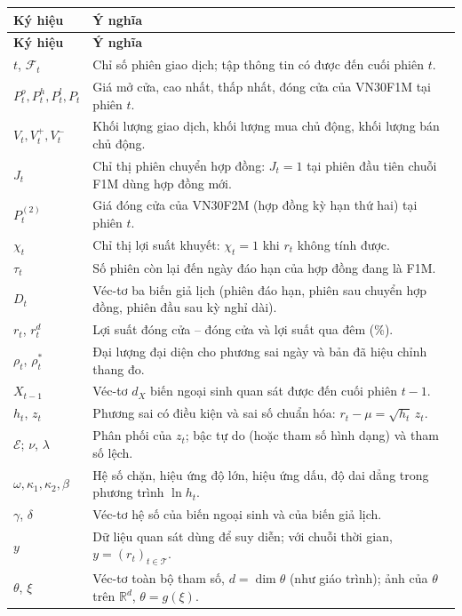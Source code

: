 \documentclass[12pt,a4paper]{article}
\theoremstyle{definition}
\theoremstyle{remark}
\newcommand{\Fcal}{\mathcal{F}}
\newcommand{\Ecal}{\mathcal{E}}
\begin{document}
\begin{longtable}{@{}p{3.4cm}p{11.4cm}@{}}
\toprule
\textbf{Ký hiệu} & \textbf{Ý nghĩa} \\
\midrule
\endfirsthead
\toprule
\textbf{Ký hiệu} & \textbf{Ý nghĩa} \\
\midrule
\endhead
\bottomrule
\endfoot
$t$, $\Fcal_t$ & Chỉ số phiên giao dịch; tập thông tin có được đến cuối phiên $t$. \\
$P^{o}_t, P^{h}_t, P^{l}_t, P_t$ & Giá mở cửa, cao nhất, thấp nhất, đóng cửa của VN30F1M tại phiên $t$. \\
$V_t, V^{+}_t, V^{-}_t$ & Khối lượng giao dịch, khối lượng mua chủ động, khối lượng bán chủ động. \\
$J_t$ & Chỉ thị phiên chuyển hợp đồng: $J_t=1$ tại phiên đầu tiên chuỗi F1M dùng hợp đồng mới. \\
$P^{(2)}_t$ & Giá đóng cửa của VN30F2M (hợp đồng kỳ hạn thứ hai) tại phiên $t$. \\
$\chi_t$ & Chỉ thị lợi suất khuyết: $\chi_t=1$ khi $r_t$ không tính được. \\
$\tau_t$ & Số phiên còn lại đến ngày đáo hạn của hợp đồng đang là F1M. \\
$D_t$ & Véc-tơ ba biến giả lịch (phiên đáo hạn, phiên sau chuyển hợp đồng, phiên đầu sau kỳ nghỉ dài). \\
$r_t$, $r^{d}_t$ & Lợi suất đóng cửa -- đóng cửa và lợi suất qua đêm (\%). \\
$\rho_t$, $\rho^{*}_t$ & Đại lượng đại diện cho phương sai ngày và bản đã hiệu chỉnh thang đo. \\
$X_{t-1}$ & Véc-tơ $d_X$ biến ngoại sinh quan sát được đến cuối phiên $t-1$. \\
$h_t$, $z_t$ & Phương sai có điều kiện và sai số chuẩn hóa: $r_t-\mu=\sqrt{h_t}\,z_t$. \\
$\Ecal$; $\nu$, $\lambda$ & Phân phối của $z_t$; bậc tự do (hoặc tham số hình dạng) và tham số lệch. \\
$\omega,\kappa_1,\kappa_2,\beta$ & Hệ số chặn, hiệu ứng độ lớn, hiệu ứng dấu, độ dai dẳng trong phương trình $\ln h_t$. \\
$\gamma$, $\delta$ & Véc-tơ hệ số của biến ngoại sinh và của biến giả lịch. \\
$y$ & Dữ liệu quan sát dùng để suy diễn; với chuỗi thời gian, $y=(r_t)_{t\in\mathcal T}$. \\
$\theta$, $\xi$ & Véc-tơ toàn bộ tham số, $d=\dim\theta$ (như giáo trình); ảnh của $\theta$ trên $\mathbb R^{d}$, $\theta=g(\xi)$. \\

\end{longtable}
\end{document}
